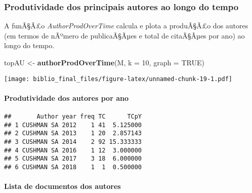 \documentclass[]{article}
\newenvironment{Shaded}{\begin{snugshade}}{\end{snugshade}}
\newcommand{\KeywordTok}[1]{\textcolor[rgb]{0.13,0.29,0.53}{\textbf{#1}}}
\newcommand{\DataTypeTok}[1]{\textcolor[rgb]{0.13,0.29,0.53}{#1}}
\newcommand{\DecValTok}[1]{\textcolor[rgb]{0.00,0.00,0.81}{#1}}
\newcommand{\StringTok}[1]{\textcolor[rgb]{0.31,0.60,0.02}{#1}}
\newcommand{\OtherTok}[1]{\textcolor[rgb]{0.56,0.35,0.01}{#1}}
\newcommand{\OperatorTok}[1]{\textcolor[rgb]{0.81,0.36,0.00}{\textbf{#1}}}
\newcommand{\NormalTok}[1]{#1}
\let\oldparagraph\paragraph
\renewcommand{\paragraph}[1]{\oldparagraph{#1}\mbox{}}
\begin{document}
\subsubsection{Produtividade dos principais autores ao longo do
tempo}\label{produtividade-dos-principais-autores-ao-longo-do-tempo}

A funÃ§Ã£o \emph{AuthorProdOverTime} calcula e plota a produÃ§Ã£o dos
autores (em termos de nÃºmero de publicaÃ§Ãµes e total de citaÃ§Ãµes por
ano) ao longo do tempo.

\begin{Shaded}
\begin{Highlighting}[]
\NormalTok{topAU <-}\StringTok{ }\KeywordTok{authorProdOverTime}\NormalTok{(M, }\DataTypeTok{k =} \DecValTok{10}\NormalTok{, }\DataTypeTok{graph =} \OtherTok{TRUE}\NormalTok{)}
\end{Highlighting}
\end{Shaded}

\texttt{[image: biblio\_final\_files/figure-latex/unnamed-chunk-19-1.pdf]}

\paragraph{Produtividade dos autores por
ano}\label{produtividade-dos-autores-por-ano}

\begin{Shaded}
\end{Shaded}

\begin{verbatim}
##       Author year freq TC      TCpY
## 1 CUSHMAN SA 2012    1 41  5.125000
## 2 CUSHMAN SA 2013    1 20  2.857143
## 3 CUSHMAN SA 2014    2 92 15.333333
## 4 CUSHMAN SA 2016    1 12  3.000000
## 5 CUSHMAN SA 2017    3 18  6.000000
## 6 CUSHMAN SA 2018    1  1  0.500000
\end{verbatim}

\paragraph{Lista de documentos dos
autores}\label{lista-de-documentos-dos-autores}

\begin{Shaded}
\end{Shaded}
\end{document}
